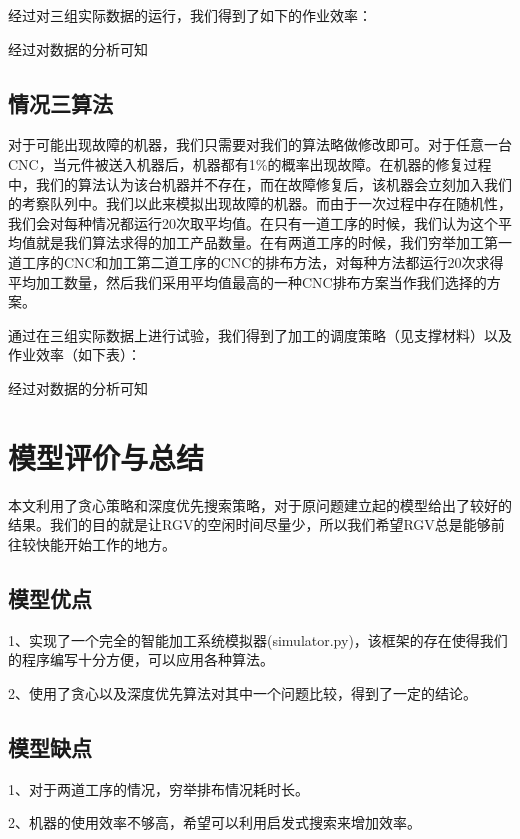 \documentclass{cumcmthesis}
\begin{document}
经过对三组实际数据的运行，我们得到了如下的作业效率：


经过对数据的分析可知{\color{red}{还有啥}}

\subsection{情况三算法}

对于可能出现故障的机器，我们只需要对我们的算法略做修改即可。对于任意一台CNC，当元件被送入机器后，机器都有1\%的概率出现故障。在机器的修复过程中，我们的算法认为该台机器并不存在，而在故障修复后，该机器会立刻加入我们的考察队列中。我们以此来模拟出现故障的机器。而由于一次过程中存在随机性，我们会对每种情况都运行20次取平均值。在只有一道工序的时候，我们认为这个平均值就是我们算法求得的加工产品数量。在有两道工序的时候，我们穷举加工第一道工序的CNC和加工第二道工序的CNC的排布方法，对每种方法都运行20次求得平均加工数量，然后我们采用平均值最高的一种CNC排布方案当作我们选择的方案。

通过在三组实际数据上进行试验，我们得到了加工的调度策略（见支撑材料）以及作业效率（如下表）：


经过对数据的分析可知{\color{red}{还有啥}}

\section{模型评价与总结}

本文利用了贪心策略和深度优先搜索策略，对于原问题建立起的模型给出了较好的结果。我们的目的就是让RGV的空闲时间尽量少，所以我们希望RGV总是能够前往较快能开始工作的地方。

\subsection{模型优点}

1、实现了一个完全的智能加工系统模拟器(simulator.py)，该框架的存在使得我们的程序编写十分方便，可以应用各种算法。

2、使用了贪心以及深度优先算法对其中一个问题比较，得到了一定的结论。

\subsection{模型缺点}

1、对于两道工序的情况，穷举排布情况耗时长。

2、机器的使用效率不够高，希望可以利用启发式搜索来增加效率。
\end{document}
